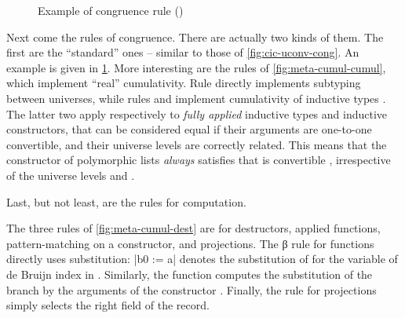 \begin{figure}[ht]
  \ContinuedFloat
  \caption{Example of congruence rule ()}
  \label{fig:meta-cumul-cong}
\end{figure}

Next come the rules of congruence. There are actually two kinds of them. The first are the
“standard” ones – similar to those of \cref{fig:cic-uconv-cong}. An example
is given in \cref{fig:meta-cumul-cong}.
More interesting are the rules of
\cref{fig:meta-cumul-cumul}, which implement “real” cumulativity. Rule  directly
implements subtyping between universes, while rules  and 
implement cumulativity of inductive types . The latter two apply respectively
to \emph{fully applied} inductive types and inductive constructors, that can be considered equal
if their arguments are one-to-one convertible, and their universe levels are correctly related.
This means that \eg the  constructor of polymorphic lists \emph{always} satisfies that
 is convertible , irrespective of the universe levels 
and .


Last, but not least, are the rules for computation.

\begin{figure*}[h]
  \ContinuedFloat
  \caption{Computation rules for destructors ()}
  \label{fig:meta-cumul-dest}
\end{figure*}

The three rules of \cref{fig:meta-cumul-dest} are for destructors, \ie applied functions,
pattern-matching on a constructor, and projections. The β rule for functions directly uses
substitution: \coqe|b{0 := a}| denotes the substitution of  for the variable of de Bruijn
index  in . Similarly, the
 function computes the substitution of the branch  by the arguments
of the constructor .
Finally, the rule for projections simply selects the right field of the record.

\begin{figure*}[h]
  \ContinuedFloat
  \caption{Computation rules for definitions ()}
  \label{fig:meta-cumul-defs}
\end{figure*}

